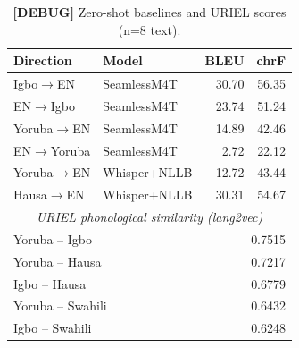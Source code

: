
\begin{table}[t]
\centering
\small
\caption{\textbf{[DEBUG]} Zero-shot baselines and URIEL scores (n=8 text).}
\label{tab:p5_debug}
\begin{tabular}{llrr}
\toprule
\textbf{Direction} & \textbf{Model} & \textbf{BLEU} & \textbf{chrF} \\
\midrule
Igbo$\to$EN   & SeamlessM4T  & 30.70 & 56.35 \\
EN$\to$Igbo   & SeamlessM4T  & 23.74 & 51.24 \\
Yoruba$\to$EN & SeamlessM4T  & 14.89 & 42.46 \\
EN$\to$Yoruba & SeamlessM4T  &  2.72 & 22.12 \\
Yoruba$\to$EN & Whisper+NLLB & 12.72 & 43.44 \\
Hausa$\to$EN  & Whisper+NLLB & 30.31 & 54.67 \\
\midrule
\multicolumn{4}{c}{\textit{URIEL phonological similarity (lang2vec)}} \\
\midrule
\multicolumn{2}{l}{Yoruba -- Igbo}    & \multicolumn{2}{r}{0.7515} \\
\multicolumn{2}{l}{Yoruba -- Hausa}   & \multicolumn{2}{r}{0.7217} \\
\multicolumn{2}{l}{Igbo -- Hausa}     & \multicolumn{2}{r}{0.6779} \\
\multicolumn{2}{l}{Yoruba -- Swahili} & \multicolumn{2}{r}{0.6432} \\
\multicolumn{2}{l}{Igbo -- Swahili}   & \multicolumn{2}{r}{0.6248} \\
\bottomrule
\end{tabular}
\end{table}
